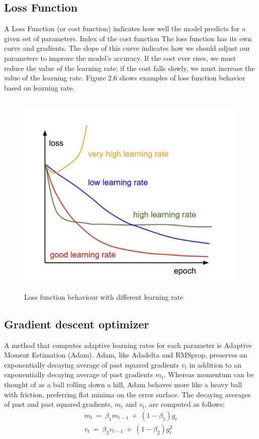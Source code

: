 \subsection{Loss Function}
\label{subsec:loss_function}
A Loss Function (or cost function) indicates how well the model predicts for a given set of parameters. Index of the cost function The loss function has its own curve and gradients. The slope of this curve indicates how we should adjust our parameters to improve the model's accuracy. If the cost ever rises, we must reduce the value of the learning rate; if the cost falls slowly, we must increase the value of the learning rate. Figure 2.6 shows examples of loss function behavior based on learning rate.
\begin{figure}[!h]
	\centering
	\includegraphics[width=\linewidth, height=10cm,keepaspectratio]{figures/loss function DL.png}
   \caption{Loss function behaviour with different learning rate}
\end{figure}

\subsection{Gradient descent optimizer}
\label{gradient_optimizer}
A method that computes adaptive learning rates for each parameter is Adaptive Moment Estimation (Adam). Adam, like Adadelta and RMSprop, preserves an exponentially decaying average of past squared gradients $v_t$ in addition to an exponentially decaying average of past gradients $m_t$. Whereas momentum can be thought of as a ball rolling down a hill, Adam behaves more like a heavy ball with friction, preferring flat minima on the error surface. The decaying averages of past and past squared gradients, $m_t$ and $v_t$, are computed as follows:
\begin{align}
    m_t \: = \: \beta_1 m_{t-1} \: + \: (1-\beta_1)g_{t}\\
    v_t \: = \: \beta_2 v_{t-1} \: + \: (1-\beta_2)g^2_t
\end{align}


